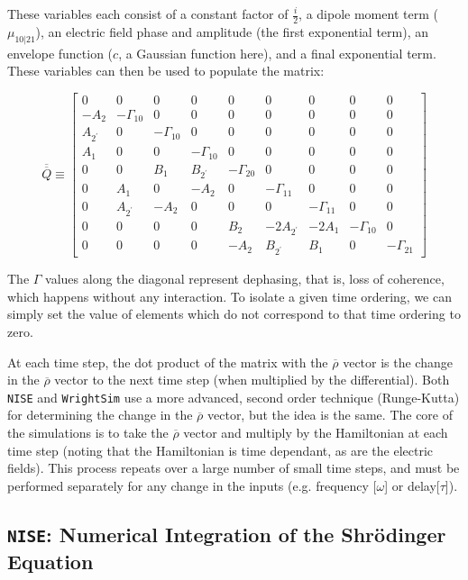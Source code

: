 \documentclass[fontsize=11pt]{scrartcl}
\numberwithin{equation}{section}		%
\numberwithin{figure}{section}			%
\numberwithin{table}{section}				%
\begin{document}
These variables each consist of a constant factor of $\frac{i}{2}$, a dipole moment term ($\mu_{10|21}$), an electric field phase and amplitude (the first exponential term), an envelope function ($c$, a Gaussian function here), and a final exponential term.
These variables can then be used to populate the matrix:

\begin{equation}
\overline{\overline{Q}} \equiv
\begin{bmatrix}
	0 & 0 & 0 & 0 & 0 & 0 & 0 & 0 & 0 \\
	-A_2 & -\Gamma_{10} & 0 & 0 & 0 & 0 & 0 & 0 & 0 \\
	A_{2^\prime} & 0 & -\Gamma_{10} & 0 & 0 & 0 & 0 & 0 & 0 \\
	A_1 & 0 & 0 & -\Gamma_{10} & 0 & 0 & 0 & 0 & 0 \\
	0 & 0 & B_1 & B_{2^\prime} & -\Gamma_{20} & 0 & 0 & 0 & 0 \\
	0 & A_1 & 0 & -A_2 & 0 & -\Gamma_{11} & 0 & 0 & 0 \\
	0 & A_{2^\prime} & -A_2 & 0 & 0 & 0 & -\Gamma_{11} & 0 & 0 \\
	0 & 0 & 0 & 0 & B_2 & -2A_{2^\prime} & -2A_1 & -\Gamma_{10} & 0 \\
	0 & 0 & 0 & 0 & -A_2 & B_{2^\prime} & B_1 & 0 & -\Gamma_{21}
\end{bmatrix}
\label{eq:single_Q}
\end{equation}

The $\Gamma$ values along the diagonal represent dephasing, that is, loss of coherence, which happens without any interaction.
To isolate a given time ordering, we can simply set the value of elements which do not correspond to that time ordering to zero.

At each time step, the dot product of the matrix with the $\overline{\rho}$ vector is the change in the $\overline{\rho}$ vector to the next time step (when multiplied by the differential).
Both \texttt{NISE} and \texttt{WrightSim} use a more advanced, second order technique (Runge-Kutta) for determining the change in the $\overline{\rho}$ vector, but the idea is the same.
The core of the simulations is to take the $\overline{\rho}$ vector and multiply by the Hamiltonian at each time step (noting that the Hamiltonian is time dependant, as are the electric fields).
This process repeats over a large number of small time steps, and must be performed separately for any change in the inputs (e.g. frequency [$\omega$] or delay[$\tau$]).


\subsection{\texttt{NISE}: Numerical Integration of the Shr{\"o}dinger Equation}
\end{document}
